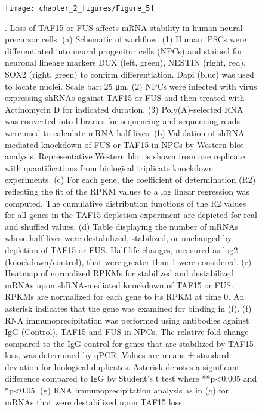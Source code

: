\begin{figure}[ht]
  \centering
  \texttt{[image: chapter\_2\_figures/Figure\_5]}
  \caption[Figure 5]{. Loss of TAF15 or FUS affects mRNA stability in human neural precursor cells. (a) Schematic of workflow. (1) Human iPSCs were differentiated into neural progenitor cells (NPCs) and stained for neuronal lineage markers DCX (left, green), NESTIN (right, red), SOX2 (right, green) to confirm differentiation. Dapi (blue) was used to locate nuclei. Scale bar: 25 μm. (2) NPCs were infected with virus expressing shRNAs against TAF15 or FUS and then treated with Actinomycin D for indicated duration. (3) Poly(A)-selected RNA was converted into libraries for sequencing and sequencing reads were used to calculate mRNA half-lives. (b) Validation of shRNA-mediated knockdown of FUS or TAF15 in NPCs by Western blot analysis. Representative Western blot is shown from one replicate with quantifications from biological triplicate knockdown experiments. (c) For each gene, the coefficient of determination (R2) reflecting the fit of the RPKM values to a log linear regression was computed. The cumulative distribution functions of the R2 values for all genes in the TAF15 depletion experiment are depicted for real and shuffled values. (d) Table displaying the number of mRNAs whose half-lives were destabilized, stabilized, or unchanged by depletion of TAF15 or FUS. Half-life changes, measured as log2 (knockdown/control), that were greater than 1 were considered. (e) Heatmap of normalized RPKMs for stabilized and destabilized mRNAs upon shRNA-mediated knockdown of TAF15 or FUS. RPKMs are normalized for each gene to its RPKM at time 0. An asterisk indicates  that the gene was examined for binding in (f). (f) RNA immunoprecipitation was performed using antibodies against IgG (Control), TAF15 and FUS in NPCs. The relative fold change compared to the IgG control for genes that are stabilized by TAF15 loss, was determined by qPCR. Values are means ± standard deviation for biological duplicates. Asterisk denotes a significant difference compared to IgG by Student’s t test where **p<0.005 and *p<0.05. (g) RNA immunoprecipitation analysis as in (g) for mRNAs that were destabilized upon TAF15 loss. }
  \label{fig:Figure_5}
\end{figure}

